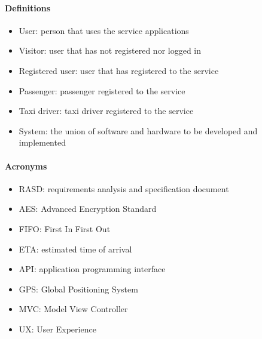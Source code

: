 \paragraph{Definitions}
\begin{itemize}
	\item User: person that uses the service applications
	\item Visitor: user that has not registered nor logged in
	\item Registered user: user that has registered to the service
	\item Passenger: passenger registered to the service
	\item Taxi driver: taxi driver registered to the service
	\item System: the union of software and hardware to be developed and implemented
\end{itemize}
\paragraph{Acronyms}
\begin{itemize}
	\item RASD: requirements analysis and specification document
	\item AES: Advanced Encryption Standard
	\item FIFO: First In First Out
	\item ETA: estimated time of arrival
	\item API: application programming interface
	\item GPS: Global Positioning System
	\item MVC: Model View Controller
	\item UX: User Experience
\end{itemize}